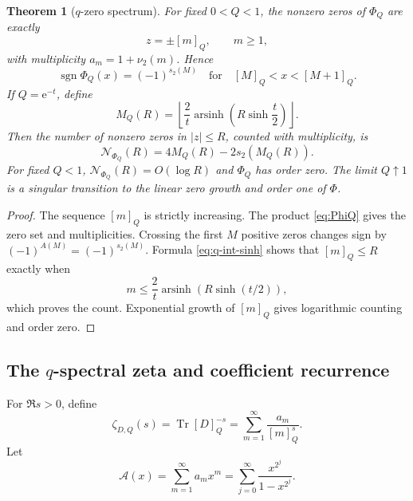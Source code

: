 \documentclass[11pt,oneside]{article}
\numberwithin{equation}{section}
\theoremstyle{plain}
\newtheorem{theorem}{Theorem}[section]
\theoremstyle{definition}
\theoremstyle{remark}
\newcommand{\Tr}{\operatorname{Tr}}
\newcommand{\arsinh}{\operatorname{arsinh}}
\newcommand{\sgn}{\operatorname{sgn}}
\newcommand{\Acal}{\mathcal A}
\newcommand{\e}{\mathrm e}
\begin{document}
\begin{theorem}[$q$-zero spectrum]\label{thm:q-zeros}
For fixed $0<Q<1$, the nonzero zeros of $\Phi_Q$ are exactly
\begin{equation}\label{eq:q-zero-set}
 z=\pm[m]_Q,\qquad m\ge1,
\end{equation}
with multiplicity $a_m=1+\nu_2(m)$.  Hence
\begin{equation}\label{eq:q-sign}
 \boxed{\ \sgn\Phi_Q(x)=(-1)^{s_2(M)}
 \quad\text{for}\quad [M]_Q<x<[M+1]_Q.\ }
\end{equation}
If $Q=\e^{-t}$, define
\begin{equation}\label{eq:MQ}
 M_Q(R)=\left\lfloor
 \frac2t\arsinh\!\left(R\sinh\frac t2\right)
 \right\rfloor.
\end{equation}
Then the number of nonzero zeros in $|z|\le R$, counted with multiplicity, is
\begin{equation}\label{eq:q-zero-count}
 \boxed{\ \mathcal N_{\Phi_Q}(R)
 =4M_Q(R)-2s_2(M_Q(R)).\ }
\end{equation}
For fixed $Q<1$, $\mathcal N_{\Phi_Q}(R)=O(\log R)$ and $\Phi_Q$ has order zero.  The limit $Q\uparrow1$ is a singular transition to the linear zero growth and order one of $\Phi$.
\end{theorem}

\begin{proof}
The sequence $[m]_Q$ is strictly increasing.  The product \cref{eq:PhiQ} gives the zero set and multiplicities.  Crossing the first $M$ positive zeros changes sign by $(-1)^{A(M)}=(-1)^{s_2(M)}$.  Formula \cref{eq:q-int-sinh} shows that $[m]_Q\le R$ exactly when
\[
 m\le\frac2t\arsinh\!\left(R\sinh(t/2)\right),
\]
which proves the count.  Exponential growth of $[m]_Q$ gives logarithmic counting and order zero.
\end{proof}

\subsection{The $q$-spectral zeta and coefficient recurrence}

For $\Re s>0$, define
\begin{equation}\label{eq:zetaDQ}
 \zeta_{D,Q}(s)=\Tr[D]_Q^{-s}
 =\sum_{m=1}^{\infty}\frac{a_m}{[m]_Q^s}.
\end{equation}
Let
\begin{equation}\label{eq:A-lambert}
 \Acal(x)=\sum_{m=1}^{\infty}a_mx^m
 =\sum_{j=0}^{\infty}\frac{x^{2^j}}{1-x^{2^j}}.
\end{equation}
\end{document}
